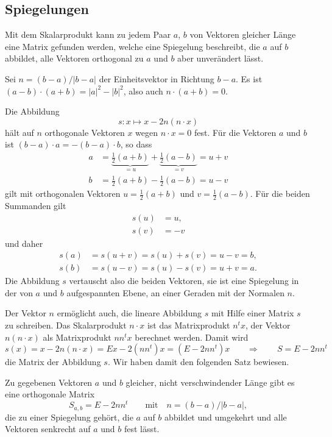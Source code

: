 \subsection{Spiegelungen
\label{buch:subsection:spiegelungn}}
Mit dem Skalarprodukt kann zu jedem Paar $a$, $b$ von Vektoren 
gleicher Länge eine Matrix gefunden werden, welche eine Spiegelung
beschreibt, die $a$ auf $b$ abbildet, alle Vektoren orthogonal zu
$a$ und $b$ aber unverändert lässt.

Sei $n=(b-a)/|b-a|$ der Einheitsvektor in Richtung $b-a$.
Es ist $(a-b)\cdot (a+b) = |a|^2 - |b|^2$, also auch $n\cdot (a+b)=0$.

Die Abbildung
\[
s:
x\mapsto  x - 2 n(n\cdot x) 
\]
hält auf $n$ orthogonale Vektoren $x$ wegen $n\cdot x=0$ fest.
Für die Vektoren $a$ und $b$ ist $(b-a)\cdot a= -(b-a)\cdot b$, so
dass
\begin{align*}
a
&=
\underbrace{\frac12(a+b)}_{\displaystyle =u}
+
\underbrace{\frac12(a-b)}_{\displaystyle=v}
=
u+v
\\
b&= \frac12(a+b) - \frac12(a-b) = u - v
\end{align*}
gilt mit orthogonalen Vektoren $u=\frac12(a+b)$ und $v=\frac12(a-b)$.
Für die beiden Summanden gilt
\begin{align*}
s(u) &= u,\\
s(v) &= -v
\end{align*}
und daher
\begin{align*}
s(a)
&=
s(u+v)=s(u)+s(v)=u-v = b,
\\
s(b)
&=
s(u-v)=s(u)-s(v)=u+v = a.
\end{align*}
Die Abbildung $s$ vertauscht also die beiden Vektoren, sie ist eine
Spiegelung in der von $a$ und $b$ aufgespannten Ebene, an einer
Geraden mit der Normalen $n$.

Der Vektor $n$ ermöglicht auch, die lineare Abbildung $s$ mit Hilfe
einer Matrix $s$ zu schreiben.
Das Skalarprodukt $n\cdot x$ ist das Matrixprodukt $n^t x$, der Vektor
$n(n\cdot x)$ als Matrixprodukt $nn^tx$ berechnet werden. 
Damit wird 
\[
s(x)
=
x - 2n(n\cdot x)
=
Ex - 2(nn^t) x
=
(E-2nn^t) x
\qquad\Rightarrow\qquad
S=E-2nn^t
\]
die Matrix der Abbildung $s$.
Wir haben damit den folgenden Satz bewiesen.

\begin{satz}
\label{buch:satz:sab}
Zu gegebenen Vektoren $a$ und $b$ gleicher, nicht verschwindender
Länge gibt es eine orthogonale Matrix
\[
S_{a,b} = E-2nn^t\qquad \text{mit}\quad n = (b-a)/|b-a|,
\]
die zu einer Spiegelung gehört, die $a$ auf $b$ abbildet und
umgekehrt  und alle Vektoren senkrecht auf $a$ und $b$ fest lässt.
\end{satz}

